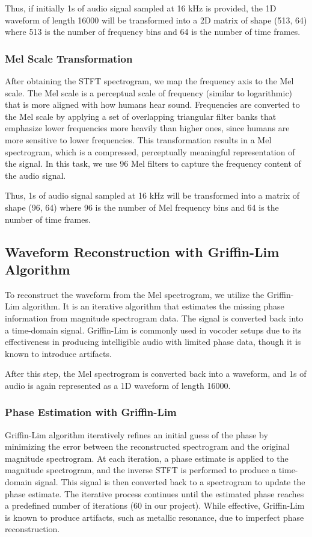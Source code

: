 \documentclass{article}
\begin{document}
Thus, if initially 1s of audio signal sampled at 16 kHz is provided, the 1D waveform of length 16000 will be transformed into a 2D matrix of shape (513, 64) where 513 is the number of frequency bins and 64 is the number of time frames.

\subsubsection{Mel Scale Transformation}

After obtaining the STFT spectrogram, we map the frequency axis to the Mel scale. The Mel scale is a perceptual scale of frequency (similar to logarithmic) that is more aligned with how humans hear sound. Frequencies are converted to the Mel scale by applying a set of overlapping triangular filter banks that emphasize lower frequencies more heavily than higher ones, since humans are more sensitive to lower frequencies. This transformation results in a Mel spectrogram, which is a compressed, perceptually meaningful representation of the signal. In this task, we use 96 Mel filters to capture the frequency content of the audio signal.

Thus, 1s of audio signal sampled at 16 kHz will be transformed into a matrix of shape (96, 64) where 96 is the number of Mel frequency bins and 64 is the number of time frames.

\subsection{Waveform Reconstruction with Griffin-Lim Algorithm}

To reconstruct the waveform from the Mel spectrogram, we utilize the Griffin-Lim algorithm. It is an iterative algorithm that estimates the missing phase information from magnitude spectrogram data. The signal is converted back into a time-domain signal. Griffin-Lim is commonly used in vocoder setups due to its effectiveness in producing intelligible audio with limited phase data, though it is known to introduce artifacts.

After this step, the Mel spectrogram is converted back into a waveform, and 1s of audio is again represented as a 1D waveform of length 16000.

\subsubsection{Phase Estimation with Griffin-Lim}

Griffin-Lim algorithm iteratively refines an initial guess of the phase by minimizing the error between the reconstructed spectrogram and the original magnitude spectrogram. At each iteration, a phase estimate is applied to the magnitude spectrogram, and the inverse STFT is performed to produce a time-domain signal. This signal is then converted back to a spectrogram to update the phase estimate. The iterative process continues until the estimated phase reaches a predefined number of iterations (60 in our project). While effective, Griffin-Lim is known to produce artifacts, such as metallic resonance, due to imperfect phase reconstruction.
\end{document}
